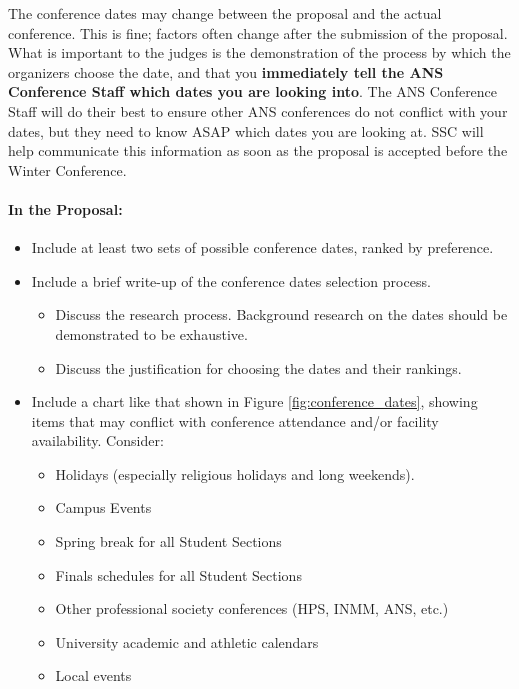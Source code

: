 \documentclass[12pt]{article}
\begin{document}
The conference dates may change between the proposal and the actual conference. This is fine; factors often change after the submission of the proposal. What is important to the judges is the demonstration of the process by which the organizers choose the date, and that you \textbf{immediately tell the ANS Conference Staff which dates you are looking into}. The ANS Conference Staff will do their best to ensure other ANS conferences do not conflict with your dates, but they need to know ASAP which dates you are looking at. SSC will help communicate this information as soon as the proposal is accepted before the Winter Conference.

\paragraph{In the Proposal:}
\begin{itemize}
    \item{Include at least two sets of possible conference dates, ranked by preference.}
    \item{Include a brief write-up of the conference dates selection process.
    \begin{itemize}
        \item{Discuss the research process. Background research on the dates should be demonstrated to be exhaustive.}
        \item{Discuss the justification for choosing the dates and their rankings.}
    \end{itemize}
    }
    \item{Include a chart like that shown in Figure \ref{fig:conference_dates}, showing items that may conflict with conference attendance and/or facility availability. Consider:
    \begin{itemize}
        \item{Holidays (especially religious holidays and long weekends).}
        \item{Campus Events}
        \item{Spring break for all Student Sections}
        \item{Finals schedules for all Student Sections}
        \item{Other professional society conferences (HPS, INMM, ANS, etc.)}
        \item{University academic and athletic calendars}
        \item{Local events}
    \end{itemize}
    }
\end{itemize}
\end{document}
